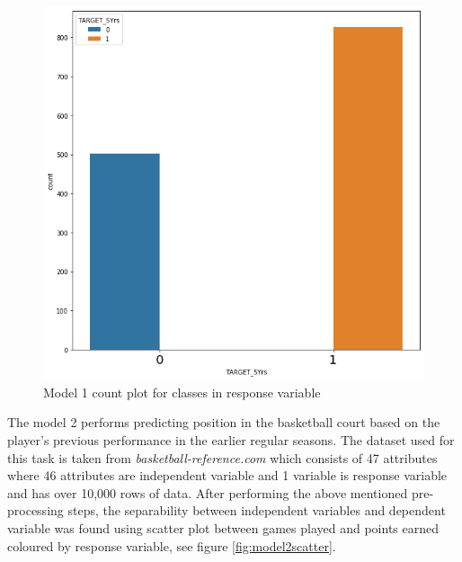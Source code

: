 \documentclass[format=sigconf]{acmart}
\begin{document}
\begin{figure}[H]
    \centering
    \includegraphics[scale=0.25]{model_1_bar_plot.png}
    \caption{Model 1 count plot for classes in response variable}
    \label{fig:model1bar}
\end{figure}
The model 2 performs predicting position in the basketball court based on the player's previous performance in the earlier regular 
seasons. The dataset used for this task is taken from \textit{basketball-reference.com} which consists of 47 attributes where 46 
attributes are independent variable and 1 variable is response variable and has over 10,000 rows of data. After performing the above 
mentioned pre-processing steps, the separability between independent variables and dependent variable was found using scatter plot
between games played and points earned coloured by response variable, see figure \ref{fig:model2scatter}.
\end{document}
